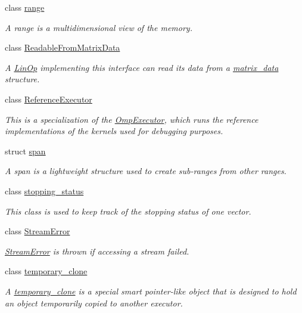 \begin{DoxyCompactItemize}
class \hyperlink{classgko_1_1range}{range}
\begin{DoxyCompactList}\small\item\em A range is a multidimensional view of the memory. \end{DoxyCompactList}\item 
class \hyperlink{classgko_1_1ReadableFromMatrixData}{Readable\+From\+Matrix\+Data}
\begin{DoxyCompactList}\small\item\em A \hyperlink{classgko_1_1LinOp}{Lin\+Op} implementing this interface can read its data from a \hyperlink{structgko_1_1matrix__data}{matrix\+\_\+data} structure. \end{DoxyCompactList}\item 
class \hyperlink{classgko_1_1ReferenceExecutor}{Reference\+Executor}
\begin{DoxyCompactList}\small\item\em This is a specialization of the \hyperlink{classgko_1_1OmpExecutor}{Omp\+Executor}, which runs the reference implementations of the kernels used for debugging purposes. \end{DoxyCompactList}\item 
struct \hyperlink{structgko_1_1span}{span}
\begin{DoxyCompactList}\small\item\em A span is a lightweight structure used to create sub-\/ranges from other ranges. \end{DoxyCompactList}\item 
class \hyperlink{classgko_1_1stopping__status}{stopping\+\_\+status}
\begin{DoxyCompactList}\small\item\em This class is used to keep track of the stopping status of one vector. \end{DoxyCompactList}\item 
class \hyperlink{classgko_1_1StreamError}{Stream\+Error}
\begin{DoxyCompactList}\small\item\em \hyperlink{classgko_1_1StreamError}{Stream\+Error} is thrown if accessing a stream failed. \end{DoxyCompactList}\item 
class \hyperlink{classgko_1_1temporary__clone}{temporary\+\_\+clone}
\begin{DoxyCompactList}\small\item\em A \hyperlink{classgko_1_1temporary__clone}{temporary\+\_\+clone} is a special smart pointer-\/like object that is designed to hold an object temporarily copied to another executor. \end{DoxyCompactList}\item 

\end{DoxyCompactItemize}
